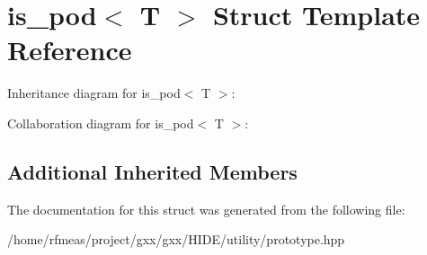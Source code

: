 \hypertarget{structis__pod}{}\section{is\+\_\+pod$<$ T $>$ Struct Template Reference}
\label{structis__pod}


Inheritance diagram for is\+\_\+pod$<$ T $>$\+:


Collaboration diagram for is\+\_\+pod$<$ T $>$\+:
\subsection*{Additional Inherited Members}


The documentation for this struct was generated from the following file\+:\begin{DoxyCompactItemize}
\item 
/home/rfmeas/project/gxx/gxx/\+H\+I\+D\+E/utility/prototype.\+hpp\end{DoxyCompactItemize}
